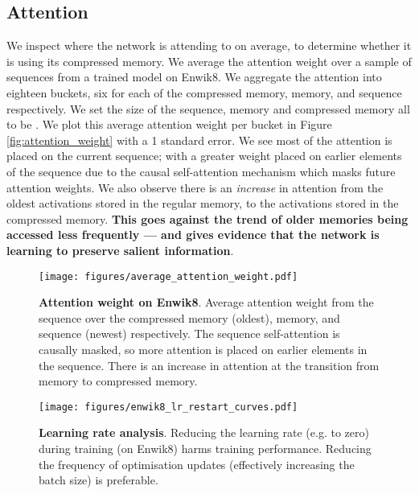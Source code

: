 \documentclass{article} \usepackage{iclr2020_conference,times}
\begin{document}
\subsection{Attention}
\vspace{-0.5em}
We inspect where the network is attending to on average, to determine whether it is using its compressed memory. We average the attention weight over a sample of  sequences from a trained model on Enwik8. We aggregate the attention into eighteen buckets, six for each of the compressed memory, memory, and sequence respectively. We set the size of the sequence, memory and compressed memory all to be . We plot this average attention weight per bucket in Figure \ref{fig:attention_weight} with a 1 standard error. We see most of the attention is placed on the current sequence; with a greater weight placed on earlier elements of the sequence due to the causal self-attention mechanism which masks future attention weights. We also observe there is an \textit{increase} in attention from the oldest activations stored in the regular memory, to the activations stored in the compressed memory. \textbf{This goes against the trend of older memories being accessed less frequently --- and gives evidence that the network is learning to preserve salient information}.
\begin{figure}[]
    \centering
    \begin{minipage}[t]{0.48\linewidth}
        \centering
    \texttt{[image: figures/average\_attention\_weight.pdf]}
    \caption{\textbf{Attention weight on Enwik8}. Average attention weight from the sequence over the compressed memory (oldest), memory, and sequence (newest) respectively. The sequence self-attention is causally masked, so more attention is placed on earlier elements in the sequence. There is an increase in attention at the transition from memory to compressed memory. }
    \label{fig:attention_weight}
    \end{minipage}
    \hspace{1em}
    \begin{minipage}[t]{0.48\linewidth}
    \texttt{[image: figures/enwik8\_lr\_restart\_curves.pdf]}
    \caption{\textbf{Learning rate analysis}. Reducing the learning rate (e.g. to zero) during training (on Enwik8) harms training performance. Reducing the frequency of optimisation updates (effectively increasing the batch size) is preferable.}
    \label{fig:restart_curves}
    \end{minipage}
\end{figure}
\end{document}
